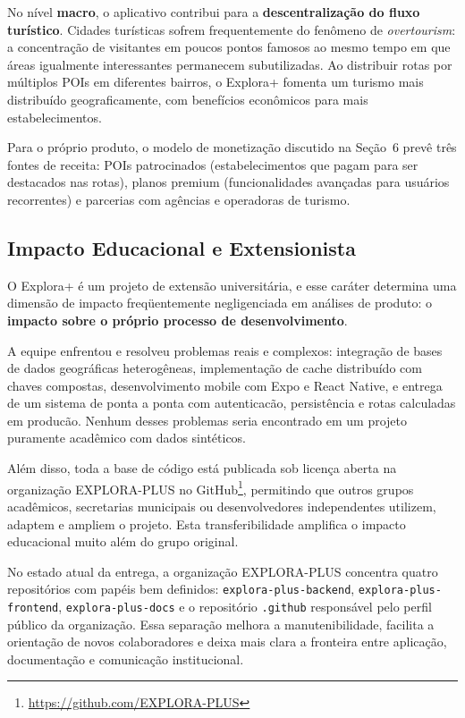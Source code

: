 \documentclass[12pt, a4paper]{article}
\begin{document}
No n\'ivel \textbf{macro}, o aplicativo contribui para a \textbf{descentraliza\c{c}\~ao do fluxo tur\'istico}. Cidades tur\'isticas sofrem frequentemente do fen\^omeno de \textit{overtourism}: a concentra\c{c}\~ao de visitantes em poucos pontos famosos ao mesmo tempo em que \'areas igualmente interessantes permanecem subutilizadas. Ao distribuir rotas por m\'ultiplos POIs em diferentes bairros, o Explora+ fomenta um turismo mais distribu\'ido geograficamente, com benef\'icios econ\^omicos para mais estabelecimentos.

Para o pr\'oprio produto, o modelo de monetiza\c{c}\~ao discutido na Se\c{c}\~ao~6 prev\^e tr\^es fontes de receita: POIs patrocinados (estabelecimentos que pagam para ser destacados nas rotas), planos premium (funcionalidades avan\c{c}adas para usu\'arios recorrentes) e parcerias com ag\^encias e operadoras de turismo.

\subsection{Impacto Educacional e Extensionista}

O Explora+ \'e um projeto de extens\~ao universit\'aria, e esse car\'ater determina uma dimens\~ao de impacto freq\"uentemente negligenciada em an\'alises de produto: o \textbf{impacto sobre o pr\'oprio processo de desenvolvimento}.

A equipe enfrentou e resolveu problemas reais e complexos: integra\c{c}\~ao de bases de dados geogr\'aficas heterog\^eneas, implementa\c{c}\~ao de cache distribu\'ido com chaves compostas, desenvolvimento mobile com Expo e React Native, e entrega de um sistema de ponta a ponta com autenticac\~ao, persist\^encia e rotas calculadas em produc\~ao. Nenhum desses problemas seria encontrado em um projeto puramente acad\^emico com dados sint\'eticos.

Al\'em disso, toda a base de c\'odigo est\'a publicada sob licen\c{c}a aberta na organiza\c{c}\~ao EXPLORA-PLUS no GitHub\footnote{\url{https://github.com/EXPLORA-PLUS}}, permitindo que outros grupos acad\^emicos, secretarias municipais ou desenvolvedores independentes utilizem, adaptem e ampliem o projeto. Esta transferibilidade amplifica o impacto educacional muito al\'em do grupo original.

No estado atual da entrega, a organiza\c{c}\~ao EXPLORA-PLUS concentra quatro reposit\'orios com pap\'eis bem definidos: \texttt{explora-plus-backend}, \texttt{explora-plus-frontend}, \texttt{explora-plus-docs} e o reposit\'orio \texttt{.github} respons\'avel pelo perfil p\'ublico da organiza\c{c}\~ao. Essa separa\c{c}\~ao melhora a manutenibilidade, facilita a orienta\c{c}\~ao de novos colaboradores e deixa mais clara a fronteira entre aplica\c{c}\~ao, documenta\c{c}\~ao e comunica\c{c}\~ao institucional.
\end{document}
